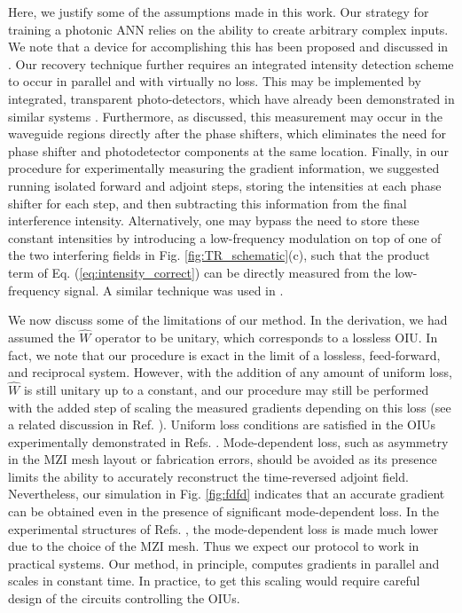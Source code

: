 Here, we justify some of the assumptions made in this work.  Our strategy for training a photonic ANN relies on the ability to create arbitrary complex inputs.  We note that a device for accomplishing this has been proposed and discussed in \cite{Miller2017}.  Our recovery technique further requires an integrated intensity detection scheme to occur in parallel and with virtually no loss.  This may be implemented by integrated, transparent photo-detectors, which have already been demonstrated in similar systems \cite{Annoni2017}.  Furthermore, as discussed, this measurement may occur in the waveguide regions directly after the phase shifters, which eliminates the need for phase shifter and photodetector components at the same location.  Finally, in our procedure for experimentally measuring the gradient information, we suggested running isolated forward and adjoint steps, storing the intensities at each phase shifter for each step, and then subtracting this information from the final interference intensity. Alternatively, one may bypass the need to store these constant intensities by introducing a low-frequency modulation on top of one of the two interfering fields in Fig. \ref{fig:TR_schematic}(c), such that the product term of Eq. (\ref{eq:intensity_correct}) can be directly measured from the low-frequency signal.  A similar technique was used in \cite{Annoni2017}.


We now discuss some of the limitations of our method.  In the derivation, we had assumed the $\hat{W}$ operator to be unitary, which corresponds to a lossless OIU.  In fact, we note that our procedure is exact in the limit of a lossless, feed-forward, and reciprocal system.  However, with the addition of any amount of uniform loss, $\hat{W}$ is still unitary up to a constant, and our procedure may still be performed with the added step of scaling the measured gradients depending on this loss (see a related discussion in Ref. \cite{Miller2017}).  Uniform loss conditions are satisfied in the OIUs experimentally demonstrated in Refs. \cite{Shen2017, Miller2013}.  Mode-dependent loss, such as asymmetry in the MZI mesh layout or fabrication errors, should be avoided as its presence limits the ability to accurately reconstruct the time-reversed adjoint field.  Nevertheless, our simulation in Fig. \ref{fig:fdfd} indicates that an accurate gradient can be obtained even in the presence of significant mode-dependent loss.  In the experimental structures of  Refs. \cite{Shen2017, Miller2013}, the mode-dependent loss is made much lower due to the choice of the MZI mesh.  Thus we expect our protocol to work in practical systems.  Our method, in principle, computes gradients in parallel and scales in constant time.  In practice, to get this scaling would require careful design of the circuits controlling the OIUs.

